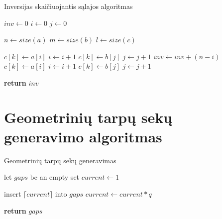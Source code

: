 \documentclass{VUMIFInfBakalaurinis}
\begin{document}
\begin{algorithm}[H]
  \caption{Inversijas skaičiuojantis sąlajos algoritmas}\label{alg:merge}
  \begin{algorithmic}[1]
      \State $inv \gets 0$
      \State $i \gets 0$
      \State $j \gets 0$

      \State $n \gets size(a)$
      \State $m \gets size(b)$
      \State $l \gets size(c)$
      
              \State $c[k] \gets a[i]$
              \State $i \gets i+1$
            \Else
              \State $c[k] \gets b[j]$
              \State $j \gets j+1$
              \State $inv \gets inv + (n-i)$
            \EndIf
          \Else
            \State $c[k] \gets a[i]$
            \State $i \gets i+1$
          \EndIf
        \Else
          \State $c[k] \gets b[j]$
          \State $j \gets j+1$
        \EndIf
      \EndFor

      \State \textbf{return} $inv$
      
    \EndProcedure
  \end{algorithmic}
\end{algorithm}

\section{Geometrinių tarpų sekų generavimo algoritmas}

\begin{algorithm}[H]
  \caption{Geometrinių tarpų sekų generavimas}\label{alg:geometric_gaps}
  \begin{algorithmic}[1]
      \State let $gaps$ be an empty set
      \State $current \gets 1$
      
        \State insert $\lceil current \rceil$ into $gaps$
        \State $current \gets current * q$ 
      \EndWhile

      \State \textbf{return} $gaps$
    \EndProcedure
  \end{algorithmic}
\end{algorithm}
\end{document}
